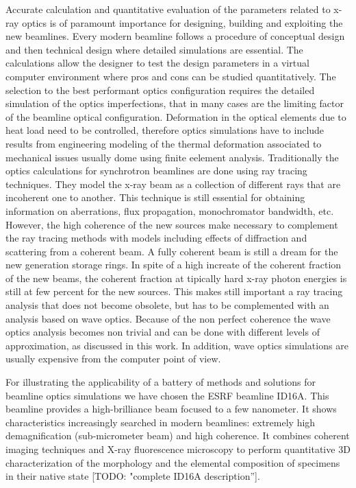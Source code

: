 \documentclass{iucr}              %
\newcommand{\todo}[1]{{\color{red}[TODO: "#1'']}}
\begin{document}
Accurate calculation and quantitative evaluation of the parameters related to x-ray optics is of paramount importance for designing, building and exploiting the new beamlines. Every modern beamline follows a procedure of conceptual design and then technical design where detailed simulations are essential. The calculations allow the designer to test the design parameters in a virtual computer environment where pros and cons can be studied quantitatively. The selection to the best performant optics configuration requires the detailed simulation of the optics imperfections, that in many cases are the limiting factor of the beamline optical configuration. Deformation in the optical elements due to heat load need to be controlled, therefore optics simulations have to include results from engineering modeling of the thermal deformation associated to mechanical issues usually dome using finite eelement analysis. Traditionally the optics calculations for synchrotron beamlines are done using ray tracing techniques. They model the x-ray beam as a collection of different rays that are incoherent one to another. This technique is still essential for obtaining information on aberrations, flux propagation, monochromator bandwidth, etc. However, the high coherence of the new sources make necessary to complement the ray tracing methods with models including effects of diffraction and scattering from a coherent beam. A fully coherent beam is still a dream for the new generation storage rings. In spite of a high increate of the coherent fraction of the new beams, the coherent fraction at tipically hard x-ray photon energies is still at few percent for the new sources. This makes still important a ray tracing analysis that does not become obsolete, but has to be complemented with an analysis based on wave optics. Because of the non perfect coherence the wave optics analysis becomes non trivial and can be done with different levels of approximation, as discussed in this work. In addition, wave optics simulations are usually expensive from the computer point of view.

For illustrating the applicability of a battery of methods and solutions for beamline optics simulations we have chosen the ESRF beamline ID16A. This beamline provides a high-brilliance beam focused to a few nanometer. It shows characteristics increasingly searched in modern beamlines: extremely high demagnification (sub-micrometer beam) and high coherence. It combines coherent imaging techniques and X-ray fluorescence microscopy to perform quantitative 3D characterization of the morphology and the elemental composition of specimens in their native state \todo{complete ID16A description}. 
\end{document}
